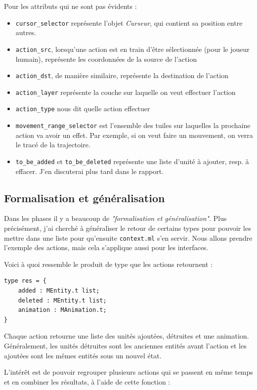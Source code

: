 \documentclass{article}
\begin{document}
Pour les attributs qui ne sont pas évidents : 

\begin{itemize}
    \item \texttt{cursor\_selector} représente l'objet \textit{Curseur}, qui contient sa position entre autres.
    \item \texttt{action\_src}, lorsqu'une action est en train d'être sélectionnée (pour le joueur humain), représente les coordonnées de la source
de l'action
    \item \texttt{action\_dst}, de manière similaire, représente la destination de l'action
    \item \texttt{action\_layer} représente la couche sur laquelle on veut effectuer l'action
    \item \texttt{action\_type} nous dit quelle action effectuer
    \item \texttt{movement\_range\_selector} est l'ensemble des tuiles sur laquelles la prochaine action va avoir un effet. Par exemple,
    si on veut faire un mouvement, on verra le tracé de la trajectoire.
    \item \texttt{to\_be\_added} et \texttt{to\_be\_deleted} représente une liste d'unité à ajouter, resp. à effacer.
    J'en discuterai plus tard dans le rapport. 
\end{itemize}
\subsection{Formalisation et généralisation}
Dans les phases il y a beaucoup de \textit{"formalisation et généralisation"}. Plus précisément, j'ai cherché
à généraliser le retour de certains types pour pouvoir les mettre dans une liste pour qu'ensuite \texttt{context.ml} s'en servir.
Nous allons prendre l'exemple des actions, mais cela s'applique aussi pour les interfaces.

Voici à quoi ressemble le produit de type que les actions retournent : 

\begin{verbatim}
type res = {
    added : MEntity.t list;
    deleted : MEntity.t list;
    animation : MAnimation.t;
}
\end{verbatim}

Chaque action retourne une liste des unités ajoutées, détruites et une animation. Généralement, les unités détruites
sont les anciennes entités avant l'action et les ajoutées sont les mêmes entités sous un nouvel état. 

L'intérêt est de pouvoir regrouper plusieurs actions qui se passent en même temps et
en combiner les résultats, à l'aide de cette fonction :
\end{document}
